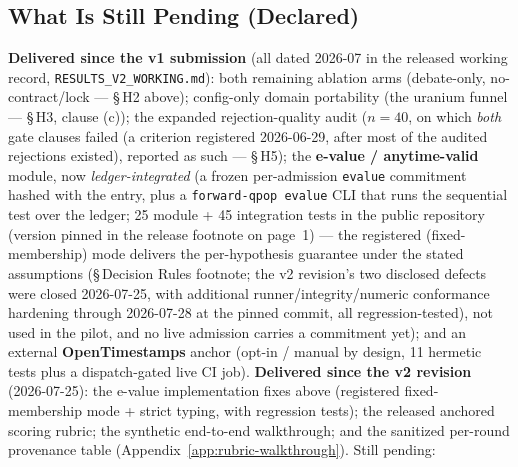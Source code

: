 \documentclass[11pt]{article}
\begin{document}
\subsection{What Is Still Pending (Declared)}

\textbf{Delivered since the v1 submission} (all dated 2026-07 in the released working record,
\texttt{RESULTS\_V2\_WORKING.md}): both
remaining ablation arms (debate-only, no-contract/lock --- \S\,H2 above); config-only domain
portability (the uranium funnel --- \S\,H3, clause (c)); the expanded rejection-quality audit
($n{=}40$, on which
\emph{both} gate clauses failed (a criterion registered 2026-06-29, after most of the audited
rejections existed), reported as such --- \S\,H5); the
\textbf{e-value / anytime-valid} module, now \emph{ledger-integrated} (a frozen per-admission
\texttt{evalue} commitment hashed with the entry, plus a \texttt{forward-qpop evalue} CLI that runs the
sequential test over the ledger; 25 module + 45 integration tests in the public
repository (version pinned in the release footnote on page~1) --- the registered
(fixed-membership) mode delivers the per-hypothesis guarantee under the stated assumptions
(\S\,Decision Rules footnote; the v2 revision's two disclosed defects were closed 2026-07-25,
with additional runner/integrity/numeric conformance hardening through 2026-07-28 at the pinned
commit, all regression-tested), not used in the pilot, and no live admission carries a
commitment yet); and an external \textbf{OpenTimestamps} anchor (opt-in / manual by design,
11 hermetic tests plus a dispatch-gated live CI job). \textbf{Delivered since the v2 revision}
(2026-07-25): the e-value implementation fixes above (registered fixed-membership mode + strict
typing, with regression tests); the released anchored scoring rubric; the synthetic end-to-end
walkthrough; and the sanitized per-round provenance table
(Appendix~\ref{app:rubric-walkthrough}). Still pending:
\end{document}
